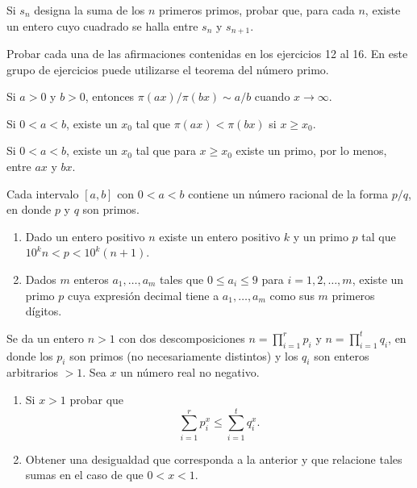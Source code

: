 \documentclass[12pt,a4paper]{book}
\begin{document}
    \begin{ejercicio}
        Si $s_{n}$ designa la suma de los $n$ primeros primos, probar que, para cada
        $n$, existe un entero cuyo cuadrado se halla entre $s_{n}$ y $s_{n+1}$.
    \end{ejercicio}

    Probar cada una de las afirmaciones contenidas en los ejercicios 12 al 16. En
    este grupo de ejercicios puede utilizarse el teorema del número primo.

    \begin{ejercicio}
        Si $a>0$ y $b>0$, entonces $\pi(ax)/\pi(bx)\sim a/b$ cuando $x\to\infty$.
    \end{ejercicio}

    \begin{ejercicio}
        Si $0<a<b$, existe un $x_{0}$ tal que $\pi(ax)<\pi(bx)$ si $x\geq x_{0}$.
    \end{ejercicio}

    \begin{ejercicio}
        Si $0<a<b$, existe un $x_{0}$ tal que para $x\geq x_{0}$ existe un primo, por lo
        menos, entre $ax$ y $bx$.
    \end{ejercicio}

    \begin{ejercicio}
        Cada intervalo $[a,b]$ con $0<a<b$ contiene un número racional de la forma
        $p/q$, en donde $p$ y $q$ son primos.
    \end{ejercicio}

    \begin{ejercicio}
        \begin{enumerate}
            \item[(a)] Dado un entero positivo $n$ existe un entero positivo $k$ y un
            primo $p$ tal que $10^{k}n<p<10^{k}(n+1)$.
            \item[(b)] Dados $m$ enteros $a_{1},\dots,a_{m}$ tales que $0\leq a_{i}\leq9$
            para $i=1,2,\dots,m$, existe un primo $p$ cuya expresión decimal tiene a
            $a_{1},\dots,a_{m}$ como sus $m$ primeros dígitos.
        \end{enumerate}
    \end{ejercicio}

    \begin{ejercicio}
        Se da un entero $n>1$ con dos descomposiciones $n=\prod_{i=1}^{r}p_{i}$ y
        $n=\prod_{i=1}^{t}q_{i}$, en donde los $p_{i}$ son primos (no necesariamente
        distintos) y los $q_{i}$ son enteros arbitrarios $>1$. Sea $x$ un número real no
        negativo.
        \begin{enumerate}
            \item[(a)] Si $x>1$ probar que
            \begin{equation*}
                \sum_{i=1}^{r}p_{i}^{x}\leq\sum_{i=1}^{t}q_{i}^{x}.
            \end{equation*}
            \item[(b)] Obtener una desigualdad que corresponda a la anterior y que
            relacione tales sumas en el caso de que $0<x<1$.
        \end{enumerate}
    \end{ejercicio}
\end{document}
